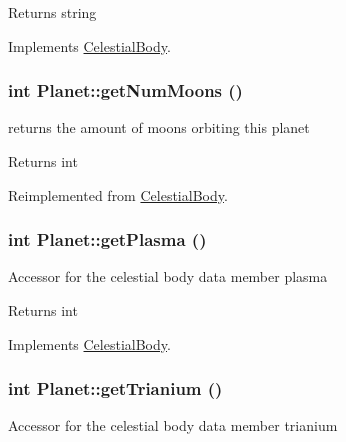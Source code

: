 \begin{DoxyReturn}{Returns}
string 
\end{DoxyReturn}


Implements \hyperlink{classCelestialBody}{CelestialBody}.

\hypertarget{classPlanet_a4c5cc040f92ec9fde52a4cccd04b69ff}{
\subsubsection[{getNumMoons}]{\setlength{\rightskip}{0pt plus 5cm}int Planet::getNumMoons ()}}
\label{d5/dec/classPlanet_a4c5cc040f92ec9fde52a4cccd04b69ff}
returns the amount of moons orbiting this planet

\begin{DoxyReturn}{Returns}
int 
\end{DoxyReturn}


Reimplemented from \hyperlink{classCelestialBody_ae41a354c4b3345c7558c9691bc7c239e}{CelestialBody}.

\hypertarget{classPlanet_ad7c07f51f9a447bf4aba45875e5f8e44}{
\subsubsection[{getPlasma}]{\setlength{\rightskip}{0pt plus 5cm}int Planet::getPlasma ()}}
\label{d5/dec/classPlanet_ad7c07f51f9a447bf4aba45875e5f8e44}
Accessor for the celestial body data member plasma

\begin{DoxyReturn}{Returns}
int 
\end{DoxyReturn}


Implements \hyperlink{classCelestialBody}{CelestialBody}.

\hypertarget{classPlanet_a37f64a787c17b5dd4471c8ad54fd9df0}{
\subsubsection[{getTrianium}]{\setlength{\rightskip}{0pt plus 5cm}int Planet::getTrianium ()}}
\label{d5/dec/classPlanet_a37f64a787c17b5dd4471c8ad54fd9df0}
Accessor for the celestial body data member trianium

